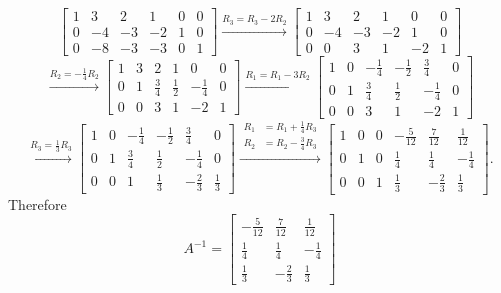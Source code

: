 \documentclass{report}
\begin{document}
{\[\begin{bmatrix}
		1 & 3  & 2  & 1  & 0 & 0 \\
		0 & -4 & -3 & -2 & 1 & 0 \\
		0 & -8 & -3 & -3 & 0 & 1
	\end{bmatrix}
	\xrightarrow{R_3=R_3-2R_2}
	\begin{bmatrix}
		1 & 3  & 2  & 1  & 0  & 0 \\
		0 & -4 & -3 & -2 & 1  & 0 \\
		0 & 0  & 3  & 1  & -2 & 1
	\end{bmatrix}
\]
\[
	\xrightarrow{R_2=-\frac{1}{4}R_2}
	\begin{bmatrix}
		1 & 3 & 2           & 1           & 0            & 0 \\
		0 & 1 & \frac{3}{4} & \frac{1}{2} & -\frac{1}{4} & 0 \\
		0 & 0 & 3           & 1           & -2           & 1
	\end{bmatrix}
	\xrightarrow{R_1=R_1-3R_2}
	\begin{bmatrix}
		1 & 0 & -\frac{1}{4} & -\frac{1}{2} & \frac{3}{4}  & 0 \\
		0 & 1 & \frac{3}{4}  & \frac{1}{2}  & -\frac{1}{4} & 0 \\
		0 & 0 & 3            & 1            & -2           & 1
	\end{bmatrix}
\]
\[
	\xrightarrow{R_3=\frac{1}{3}R_3}
	\begin{bmatrix}
		1 & 0 & -\frac{1}{4} & -\frac{1}{2} & \frac{3}{4}  & 0           \\
		0 & 1 & \frac{3}{4}  & \frac{1}{2}  & -\frac{1}{4} & 0           \\
		0 & 0 & 1            & \frac{1}{3}  & -\frac{2}{3} & \frac{1}{3}
	\end{bmatrix}
	\xrightarrow{
		\begin{aligned}
			R_1 & = R_1+\frac{1}{4}R_3 \\[4pt]
			R_2 & = R_2-\frac{3}{4}R_3
		\end{aligned}
	}
	\begin{bmatrix}
		1 & 0 & 0 & -\frac{5}{12} & \frac{7}{12} & \frac{1}{12} \\
		0 & 1 & 0 & \frac{1}{4}   & \frac{1}{4}  & -\frac{1}{4} \\
		0 & 0 & 1 & \frac{1}{3}   & -\frac{2}{3} & \frac{1}{3}
	\end{bmatrix}.
\]
Therefore
\[
	A^{-1}=
	\begin{bmatrix}
		-\frac{5}{12} & \frac{7}{12} & \frac{1}{12} \\
		\frac{1}{4}   & \frac{1}{4}  & -\frac{1}{4} \\
		\frac{1}{3}   & -\frac{2}{3} & \frac{1}{3}
	\end{bmatrix}
\]

}
\end{document}
